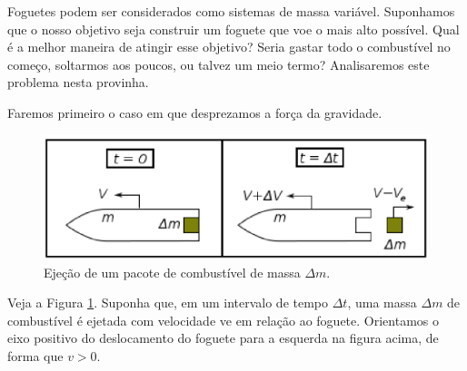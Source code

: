\documentclass[]{IMTexam}
\author{Isabella B.}
\date{}
\begin{document}
\maketitle

Foguetes podem ser considerados como sistemas de massa variável. Suponhamos que o nosso objetivo seja construir um foguete que voe o mais alto possível. Qual é a melhor maneira de atingir esse objetivo? Seria gastar todo o combustível no começo, soltarmos aos poucos, ou talvez um meio termo? Analisaremos este problema nesta provinha.

\begin{questions}

	\question \label{ques:q1}
	Faremos primeiro o caso em que desprezamos a força da gravidade.

	\begin{figure}[H]
		\centering
		\includegraphics[width=0.7\linewidth]{screenshot001}
		\caption{Ejeção de um pacote de combustível de massa $ \Delta m $.}
		\label{fig:fig1}
	\end{figure}

	Veja a Figura \ref{fig:fig1}. Suponha que, em um intervalo de tempo $ \Delta t $, uma massa $ \Delta m $ de combustível é ejetada com velocidade ve em relação ao foguete. Orientamos o eixo positivo do deslocamento do foguete para a esquerda na figura acima, de forma que $ v > 0 $.
\end{questions}
\end{document}
